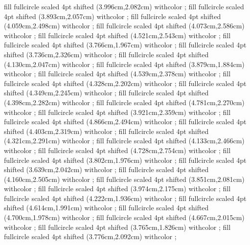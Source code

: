 {fill fullcircle scaled 4pt shifted (3.996cm,2.082cm) withcolor ;
fill fullcircle scaled 4pt shifted (3.893cm,2.057cm) withcolor ;
fill fullcircle scaled 4pt shifted (4.059cm,2.498cm) withcolor ;
fill fullcircle scaled 4pt shifted (4.073cm,2.586cm) withcolor ;
fill fullcircle scaled 4pt shifted (4.521cm,2.543cm) withcolor ;
fill fullcircle scaled 4pt shifted (3.766cm,1.967cm) withcolor ;
fill fullcircle scaled 4pt shifted (3.736cm,2.326cm) withcolor ;
fill fullcircle scaled 4pt shifted (4.130cm,2.047cm) withcolor ;
fill fullcircle scaled 4pt shifted (3.879cm,1.884cm) withcolor ;
fill fullcircle scaled 4pt shifted (4.539cm,2.378cm) withcolor ;
fill fullcircle scaled 4pt shifted (4.328cm,2.202cm) withcolor ;
fill fullcircle scaled 4pt shifted (4.349cm,2.245cm) withcolor ;
fill fullcircle scaled 4pt shifted (4.398cm,2.282cm) withcolor ;
fill fullcircle scaled 4pt shifted (4.781cm,2.270cm) withcolor ;
fill fullcircle scaled 4pt shifted (3.921cm,2.359cm) withcolor ;
fill fullcircle scaled 4pt shifted (4.866cm,2.494cm) withcolor ;
fill fullcircle scaled 4pt shifted (4.403cm,2.319cm) withcolor ;
fill fullcircle scaled 4pt shifted (4.321cm,2.291cm) withcolor ;
fill fullcircle scaled 4pt shifted (4.133cm,2.466cm) withcolor ;
fill fullcircle scaled 4pt shifted (4.728cm,2.754cm) withcolor ;
fill fullcircle scaled 4pt shifted (3.802cm,1.976cm) withcolor ;
fill fullcircle scaled 4pt shifted (3.639cm,2.042cm) withcolor ;
fill fullcircle scaled 4pt shifted (4.160cm,2.505cm) withcolor ;
fill fullcircle scaled 4pt shifted (3.851cm,2.081cm) withcolor ;
fill fullcircle scaled 4pt shifted (3.974cm,2.175cm) withcolor ;
fill fullcircle scaled 4pt shifted (4.222cm,1.936cm) withcolor ;
fill fullcircle scaled 4pt shifted (4.614cm,1.991cm) withcolor ;
fill fullcircle scaled 4pt shifted (4.700cm,1.978cm) withcolor ;
fill fullcircle scaled 4pt shifted (4.667cm,2.015cm) withcolor ;
fill fullcircle scaled 4pt shifted (3.765cm,1.826cm) withcolor ;
fill fullcircle scaled 4pt shifted (3.776cm,2.092cm) withcolor ;
}
